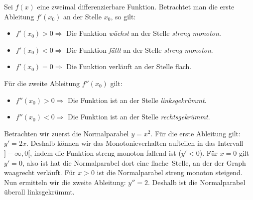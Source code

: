 \documentclass[ngerman, 12pt]{nssheetxea}
\begin{document}
\begin{theorem}
Sei $f(x)$ eine zweimal differenzierbare Funktion. Betrachtet man die erste Ableitung $f'(x_0)$ an der Stelle $x_0$, so gilt:
\begin{itemize}
\item $f'(x_0)>0 \Rightarrow$ Die Funktion \textit{wächst} an der Stelle \textit{streng monoton}.
\item $f'(x_0)<0 \Rightarrow$ Die Funktion \textit{fällt} an der Stelle \textit{streng monoton}.
\item $f'(x_0)=0 \Rightarrow$ Die Funktion verläuft an der Stelle flach.
\end{itemize}
Für die zweite Ableitung $f''(x_0)$ gilt:
\begin{itemize}
\item $f''(x_0)>0 \Rightarrow$ Die Funktion ist an der Stelle \textit{linksgekrümmt}.
\item $f''(x_0)<0 \Rightarrow$ Die Funktion ist an der Stelle \textit{rechtsgekrümmt}.
\end{itemize}
\label{Satz:KrümmungMonotonie}
\end{theorem}

\begin{example}
\item Betrachten wir zuerst die Normalparabel $y=x^2$. Für die erste Ableitung gilt: $y'=2x$. Deshalb können wir das Monotonieverhalten aufteilen in das Intervall $]-\infty, 0[$, indem die Funktion streng monoton fallend ist ($y'<0$). Für $x=0$ gilt $y'=0$, also ist hat die Normalparabel dort eine \glqq flache\grqq \ Stelle, an der der Graph waagrecht verläuft. Für $x>0$ ist die Normalparabel streng monoton steigend. Nun ermitteln wir die zweite Ableitung: $y''=2$. Deshalb ist die Normalparabel überall linksgekrümmt.
\begin{center}
\end{center}
\label{Bsp:Monotonie}
\end{example}
\end{document}
